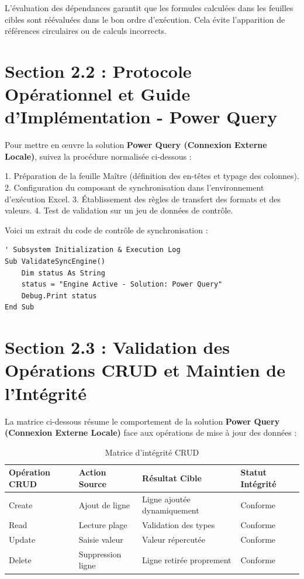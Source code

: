 \documentclass[12pt,a4paper]{report}
\begin{document}
L'évaluation des dépendances garantit que les formules calculées dans les feuilles cibles sont réévaluées dans le bon ordre d'exécution. Cela évite l'apparition de références circulaires ou de calculs incorrects.


\section{Section 2.2 : Protocole Opérationnel et Guide d'Implémentation - Power Query}
Pour mettre en œuvre la solution \textbf{Power Query (Connexion Externe Locale)}, suivez la procédure normalisée ci-dessous :

1. Préparation de la feuille Maître (définition des en-têtes et typage des colonnes).
2. Configuration du composant de synchronisation dans l'environnement d'exécution Excel.
3. Établissement des règles de transfert des formats et des valeurs.
4. Test de validation sur un jeu de données de contrôle.

Voici un extrait du code de contrôle de synchronisation :
\begin{lstlisting}[caption=Code de controle operationnel]
' Subsystem Initialization & Execution Log
Sub ValidateSyncEngine()
    Dim status As String
    status = "Engine Active - Solution: Power Query"
    Debug.Print status
End Sub
\end{lstlisting}


\section{Section 2.3 : Validation des Opérations CRUD et Maintien de l'Intégrité}
La matrice ci-dessous résume le comportement de la solution \textbf{Power Query (Connexion Externe Locale)} face aux opérations de mise à jour des données :

\begin{table}[h]
\centering
\begin{tabular}{@{}llll@{}}
\toprule
\textbf{Opération CRUD} & \textbf{Action Source} & \textbf{Résultat Cible} & \textbf{Statut Intégrité} \\ \midrule
Create & Ajout de ligne & Ligne ajoutée dynamiquement & Conforme \\
Read & Lecture plage & Validation des types & Conforme \\
Update & Saisie valeur & Valeur répercutée & Conforme \\
Delete & Suppression ligne & Ligne retirée proprement & Conforme \\ \bottomrule
\end{tabular}
\caption{Matrice d'intégrité CRUD}
\end{table}
\end{document}
